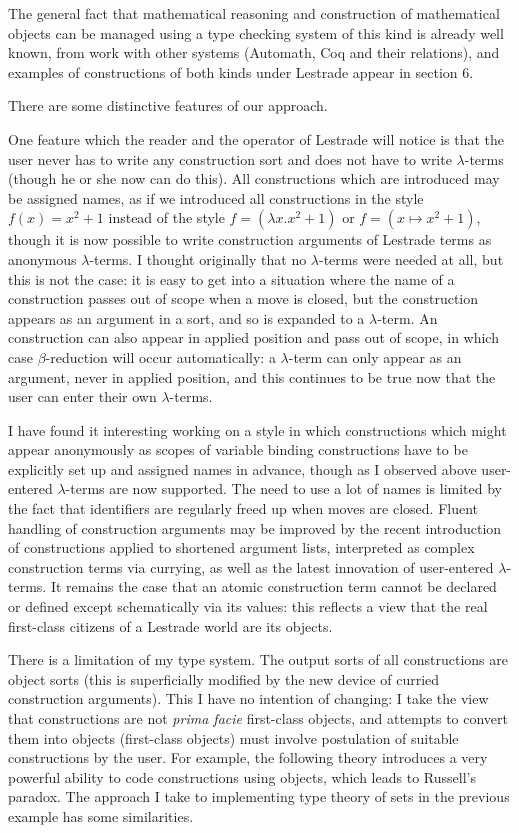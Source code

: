 \documentclass[12pt]{article}
\begin{document}
The general fact that mathematical reasoning and construction of mathematical objects can be managed using a type checking system of this kind is already well known, from work with other systems (Automath, Coq and their relations),
and examples of constructions of both kinds under Lestrade appear in section 6.

There are some distinctive features of our approach.

One feature which the reader and the operator of Lestrade will notice is that the user never has to write any construction sort and does not have to write $\lambda$-terms (though he or she now can do this).   All constructions which are introduced may be assigned names, as if we introduced all constructions in the style $f(x) = x^2+1$ instead of the style $f=(\lambda x.x^2+1)$ or $f=(x \mapsto x^2+1)$, though it is now possible to write construction arguments of Lestrade terms as anonymous $\lambda$-terms.   I thought originally
that no $\lambda$-terms were needed at all, but this is not the case:   it is easy to get into a situation where the name of a construction passes out of scope when a move is closed,
but the construction appears as an argument in a sort, and so is expanded to a $\lambda$-term.  An construction can also appear in applied position and pass out of scope,
in which case $\beta$-reduction will occur automatically:  a $\lambda$-term can only appear as an argument, never in applied position, and this continues to be true now that the user can enter their own $\lambda$-terms.

I have found it interesting working on a style in which constructions which might appear anonymously as scopes of variable binding constructions have to be explicitly set up and assigned names in advance, though as I observed above user-entered $\lambda$-terms are now supported.   The need to use a lot of names is limited by the fact that identifiers are regularly freed up when moves are closed.  Fluent handling of construction arguments may be improved by the recent introduction of constructions applied to shortened argument lists, interpreted as complex construction terms via currying, as well as the latest innovation of user-entered $\lambda$-terms.  It remains the case that an atomic construction term cannot be declared or defined except schematically via its values:  this reflects a view that the real first-class citizens of a Lestrade world are its objects.

There is a limitation of my type system.   The output sorts of all constructions are object sorts (this is superficially modified by the new device of curried construction arguments).  This I have no intention of changing:  I take the view that constructions are not {\em prima facie} first-class objects, and attempts to convert them into objects (first-class objects) must involve postulation of suitable constructions by the user.   For example, the following theory introduces a very powerful ability to code constructions using objects, which leads to Russell's paradox.   The approach I take to implementing type theory of sets in the previous example has some similarities.
\end{document}
